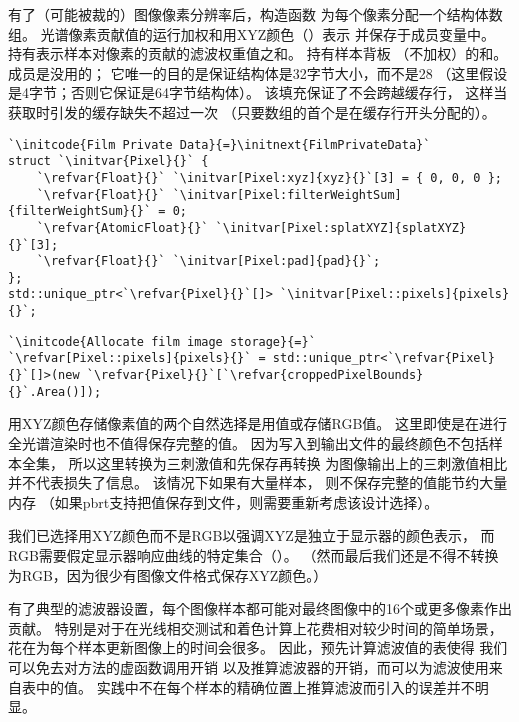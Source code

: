 有了（可能被裁的）图像像素分辨率后，构造函数
为每个像素分配一个结构体数组。
光谱像素贡献值的运行加权和用XYZ颜色（）表示
并保存于成员变量中。
持有表示样本对像素的贡献的滤波权重值之和。
持有样本背板
（不加权）的和。
成员是没用的；
它唯一的目的是保证结构体是32字节大小，而不是28
（这里假设是4字节；否则它保证是64字节结构体）。
该填充保证了不会跨越缓存行，
这样当获取时引发的缓存缺失不超过一次
（只要数组的首个是在缓存行开头分配的）。
\begin{lstlisting}
`\initcode{Film Private Data}{=}\initnext{FilmPrivateData}`
struct `\initvar{Pixel}{}` {
    `\refvar{Float}{}` `\initvar[Pixel:xyz]{xyz}{}`[3] = { 0, 0, 0 };
    `\refvar{Float}{}` `\initvar[Pixel:filterWeightSum]{filterWeightSum}{}` = 0;
    `\refvar{AtomicFloat}{}` `\initvar[Pixel:splatXYZ]{splatXYZ}{}`[3];
    `\refvar{Float}{}` `\initvar[Pixel:pad]{pad}{}`;
};
std::unique_ptr<`\refvar{Pixel}{}`[]> `\initvar[Pixel::pixels]{pixels}{}`;
\end{lstlisting}
\begin{lstlisting}
`\initcode{Allocate film image storage}{=}`
`\refvar[Pixel::pixels]{pixels}{}` = std::unique_ptr<`\refvar{Pixel}{}`[]>(new `\refvar{Pixel}{}`[`\refvar{croppedPixelBounds}{}`.Area()]);
\end{lstlisting}
用XYZ颜色存储像素值的两个自然选择是用值或存储RGB值。
这里即使是在进行全光谱渲染时也不值得保存完整的值。
因为写入到输出文件的最终颜色不包括样本全集，
所以这里转换为三刺激值和先保存再转换
为图像输出上的三刺激值相比并不代表损失了信息。
该情况下如果有大量样本，
则不保存完整的值能节约大量内存
（如果pbrt支持把值保存到文件，则需要重新考虑该设计选择）。

我们已选择用XYZ颜色而不是RGB以强调XYZ是独立于显示器的颜色表示，
而RGB需要假定显示器响应曲线的特定集合（）。
（然而最后我们还是不得不转换为RGB，因为很少有图像文件格式保存XYZ颜色。）

有了典型的滤波器设置，每个图像样本都可能对最终图像中的16个或更多像素作出贡献。
特别是对于在光线相交测试和着色计算上花费相对较少时间的简单场景，
花在为每个样本更新图像上的时间会很多。
因此，预先计算滤波值的表使得
我们可以免去对方法的虚函数调用开销
以及推算滤波器的开销，而可以为滤波使用来自表中的值。
实践中不在每个样本的精确位置上推算滤波而引入的误差并不明显。

